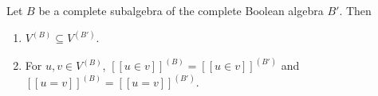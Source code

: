 Let $B$ be a complete subalgebra of the complete Boolean algebra $B'$. Then
\begin{enumerate}
\item $V^{(B)} \subseteq V^{(B')}$.
\item For $u, v \in V^{(B)}$, $[\![u \in v]\!]^{(B)} = [\![u \in v]\!]^{(B')}$ and $[\![u = v]\!]^{(B)} = [\![u = v]\!]^{(B')}$.
\end{enumerate}
